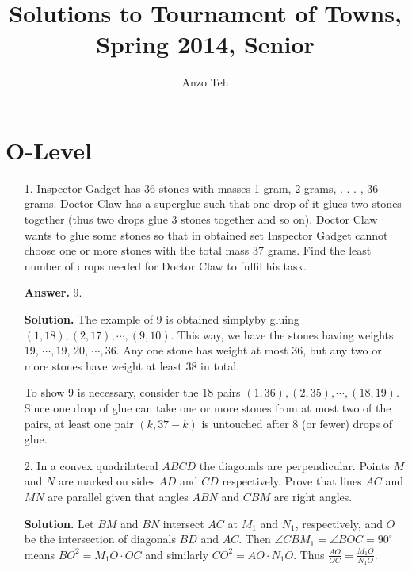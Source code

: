 \documentclass[11pt,a4paper]{article}
\begin{document}
\newcommand{\la}{\leftarrow}
\newcommand{\lra}{\leftrightarrow}
\newcommand{\bbN}{\mathbb{N}}
\newcommand{\bbZ}{\mathbb{Z}}
\newcommand{\dsum}{\displaystyle\sum}
\newcommand{\dprod}{\displaystyle\prod}


\title{Solutions to Tournament of Towns, Spring 2014, Senior}
\author{Anzo Teh}
\date{}
\maketitle

\section*{O-Level}
\begin{enumerate}
	\item[1.] 
	Inspector Gadget has 36 stones with masses 1 gram, 2 grams, . . . , 36 grams.
	Doctor Claw has a superglue such that one drop of it glues two stones together
	(thus two drops glue 3 stones together and so on). Doctor Claw wants to glue
	some stones so that in obtained set Inspector Gadget cannot choose one or more
	stones with the total mass 37 grams. Find the least number of drops needed
	for Doctor Claw to fulfil his task.
	
	\textbf{Answer.} 9. 
	
	\textbf{Solution.} 
	The example of 9 is obtained simplyby gluing $(1, 18), (2, 17), \cdots, (9, 10)$. 
	This way, we have the stones having weights 19, $\cdots, 19$, 20, $\cdots, 36$. 
	Any one stone has weight at most 36, but any two or more stones have weight at least 38 in total. 
	
	To show 9 is necessary, consider the 18 pairs $(1, 36), (2, 35), \cdots, (18, 19)$. 
	Since one drop of glue can take one or more stones from at most two of the pairs, 
	at least one pair $(k, 37-k)$ is untouched after 8 (or fewer) drops of glue. 
	
	\item [2.] In a convex quadrilateral $ABCD$ the diagonals are perpendicular. Points $M$
	and $N$ are marked on sides $AD$ and $CD$ respectively. Prove that lines $AC$ and
	$MN$ are parallel given that angles $ABN$ and $CBM$ are right angles.
	
	\textbf{Solution.} 
	Let $BM$ and $BN$ intersect $AC$ at $M_1$ and $N_1$, respectively, 
	and $O$ be the intersection of diagonals $BD$ and $AC$. 
	Then $\angle CBM_1=\angle BOC=90^{\circ}$ means $BO^2=M_1O\cdot OC$ and similarly 
	$CO^2=AO\cdot N_1O$. Thus $\frac{AO}{OC}=\frac{M_1O}{N_1O}$. 
	

\end{enumerate}
\end{document}
